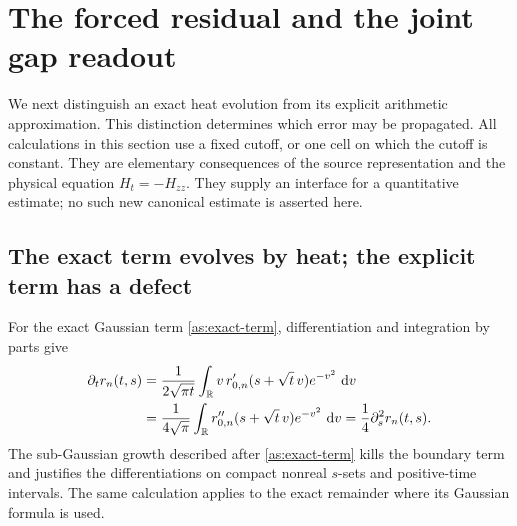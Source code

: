 \section{The forced residual and the joint gap readout}
\label{sec:residual-transport}

We next distinguish an exact heat evolution from its explicit arithmetic
approximation.  This distinction determines which error may be
propagated.  All calculations in this section use a fixed cutoff, or
one cell on which the cutoff is constant.  They are elementary
consequences of the source representation and the physical equation
$H_t=-H_{zz}$.  They supply an interface for a quantitative estimate;
no such new canonical estimate is asserted here.

\subsection{The exact term evolves by heat; the explicit term has a defect}

For the exact Gaussian term \eqref{as:exact-term}, differentiation and
integration by parts give
\begin{align}
 \partial_t r_n(t,s)
  &=\frac1{2\sqrt{\pi t}}\int_{\mathbb R}
       v\,r_{0,n}'(s+\sqrt t\,v)e^{-v^2}\,\,\mathrm d v\notag\\
  &=\frac1{4\sqrt\pi}\int_{\mathbb R}
       r_{0,n}''(s+\sqrt t\,v)e^{-v^2}\,\,\mathrm d v
    =\frac14\partial_s^2r_n(t,s).
 \label{rt:exact-term-heat}
\end{align}
The sub-Gaussian growth described after \eqref{as:exact-term} kills
the boundary term and justifies the differentiations on compact
nonreal $s$-sets and positive-time intervals.  The same calculation
applies to the exact remainder where its Gaussian formula is used.

